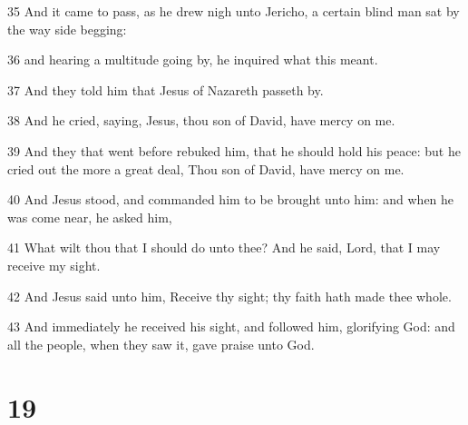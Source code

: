 \par 35 And it came to pass, as he drew nigh unto Jericho, a certain blind man sat by the way side begging:
\par 36 and hearing a multitude going by, he inquired what this meant.
\par 37 And they told him that Jesus of Nazareth passeth by.
\par 38 And he cried, saying, Jesus, thou son of David, have mercy on me.
\par 39 And they that went before rebuked him, that he should hold his peace: but he cried out the more a great deal, Thou son of David, have mercy on me.
\par 40 And Jesus stood, and commanded him to be brought unto him: and when he was come near, he asked him,
\par 41 What wilt thou that I should do unto thee? And he said, Lord, that I may receive my sight.
\par 42 And Jesus said unto him, Receive thy sight; thy faith hath made thee whole.
\par 43 And immediately he received his sight, and followed him, glorifying God: and all the people, when they saw it, gave praise unto God.

\chapter{19}

